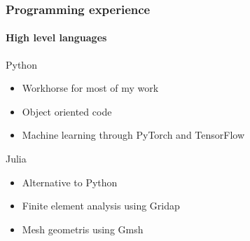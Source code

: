 \documentclass[
	10pt, %
]{beamer}
\begin{document}
\begin{frame}
	\frametitle{Programming experience}
	\framesubtitle{High level languages}

	{\large Python} 
	\begin{itemize}
		\item Workhorse for most of my work
		\item Object oriented code
		\item Machine learning through PyTorch and TensorFlow
	\end{itemize}

	{\large Julia} 
	\begin{itemize}
		\item Alternative to Python 
		\item Finite element analysis using Gridap
		\item Mesh geometris using Gmsh
	\end{itemize}


\end{frame}
\end{document}
